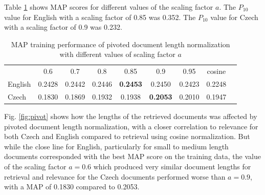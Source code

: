 \documentclass[a4paper]{article}
\begin{document}
Table \ref{tab:pivot} shows MAP scores for different values of the scaling
factor $a$. The $P_{10}$ value for English with a scaling factor of 0.85 was
0.352. The $P_{10}$ value for Czech with a scaling factor of 0.9 was 0.232.

\begin{table}[htpb]
	\centering
	\caption{MAP training performance of pivoted document length normalization 
	with different values of scaling factor $a$\\}
	\label{tab:pivot}
	\begin{tabular}{@{}lcccccccc@{}}
		\toprule
		& 0.6 & 0.7 & 0.8 & 0.85 & 0.9 & 0.95 & cosine \\
		\cmidrule(r){1-1}\cmidrule(lr){2-2}\cmidrule(lr){3-3}\cmidrule(lr){4-4}\cmidrule(lr){5-5}\cmidrule(lr){6-6}\cmidrule(lr){7-7}\cmidrule(l){8-8}
		English & 0.2428 & 0.2442 & 0.2446 & \textbf{0.2453} & 0.2450 & 0.2423 & 0.2248 \\
		\cmidrule(r){1-1}\cmidrule(lr){2-2}\cmidrule(lr){3-3}\cmidrule(lr){4-4}\cmidrule(lr){5-5}\cmidrule(lr){6-6}\cmidrule(lr){7-7}\cmidrule(l){8-8}
		Czech & 0.1830 & 0.1869 & 0.1932 & 0.1938 & \textbf{0.2053} & 0.2010 & 0.1947 \\
		\bottomrule
	\end{tabular}
\end{table}

Fig. \ref{fig:pivot} shows how the lengths of the retrieved documents was
affected by pivoted document length normalization, with a closer correlation to
relevance for both Czech and English compared to retrieval using cosine
normalization. But while the close line for English, particularly for small to
medium length documents corresponded with the best MAP score on the training
data, the value of the scaling factor $a=0.6$ which produced very similar document
lengths for retrieval and relevance for the Czech documents performed worse
than $a=0.9$, with a MAP of 0.1830 compared to 0.2053.
\end{document}

